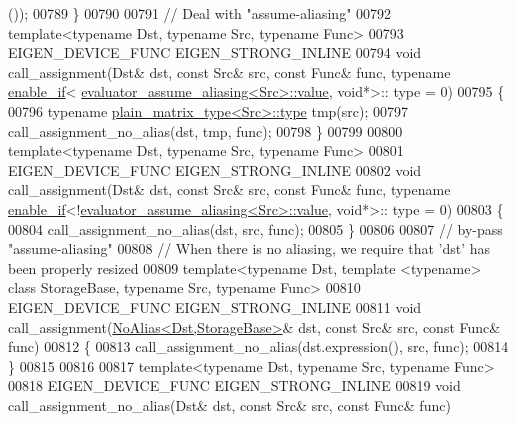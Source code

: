 \begin{DoxyCode}
      ());
00789 \}
00790                      
00791 \textcolor{comment}{// Deal with "assume-aliasing"}
00792 \textcolor{keyword}{template}<\textcolor{keyword}{typename} Dst, \textcolor{keyword}{typename} Src, \textcolor{keyword}{typename} Func>
00793 EIGEN\_DEVICE\_FUNC EIGEN\_STRONG\_INLINE
00794 \textcolor{keywordtype}{void} call\_assignment(Dst& dst, \textcolor{keyword}{const} Src& src, \textcolor{keyword}{const} Func& func, \textcolor{keyword}{typename} 
      \hyperlink{struct_eigen_1_1internal_1_1enable__if}{enable\_if}< \hyperlink{struct_eigen_1_1internal_1_1evaluator__assume__aliasing}{evaluator\_assume\_aliasing<Src>::value}, \textcolor{keywordtype}{void}*>::
      type = 0)
00795 \{
00796   \textcolor{keyword}{typename} \hyperlink{struct_eigen_1_1internal_1_1plain__matrix__type}{plain\_matrix\_type<Src>::type} tmp(src);
00797   call\_assignment\_no\_alias(dst, tmp, func);
00798 \}
00799 
00800 \textcolor{keyword}{template}<\textcolor{keyword}{typename} Dst, \textcolor{keyword}{typename} Src, \textcolor{keyword}{typename} Func>
00801 EIGEN\_DEVICE\_FUNC EIGEN\_STRONG\_INLINE
00802 \textcolor{keywordtype}{void} call\_assignment(Dst& dst, \textcolor{keyword}{const} Src& src, \textcolor{keyword}{const} Func& func, \textcolor{keyword}{typename} 
      \hyperlink{struct_eigen_1_1internal_1_1enable__if}{enable\_if}<!\hyperlink{struct_eigen_1_1internal_1_1evaluator__assume__aliasing}{evaluator\_assume\_aliasing<Src>::value}, \textcolor{keywordtype}{void}*>::
      type = 0)
00803 \{
00804   call\_assignment\_no\_alias(dst, src, func);
00805 \}
00806 
00807 \textcolor{comment}{// by-pass "assume-aliasing"}
00808 \textcolor{comment}{// When there is no aliasing, we require that 'dst' has been properly resized}
00809 \textcolor{keyword}{template}<\textcolor{keyword}{typename} Dst, \textcolor{keyword}{template} <\textcolor{keyword}{typename}> \textcolor{keyword}{class }StorageBase, \textcolor{keyword}{typename} Src, \textcolor{keyword}{typename} Func>
00810 EIGEN\_DEVICE\_FUNC EIGEN\_STRONG\_INLINE
00811 \textcolor{keywordtype}{void} call\_assignment(\hyperlink{group___core___module_class_eigen_1_1_no_alias}{NoAlias<Dst,StorageBase>}& dst, \textcolor{keyword}{const} Src& src, \textcolor{keyword}{const} Func& 
      func)
00812 \{
00813   call\_assignment\_no\_alias(dst.expression(), src, func);
00814 \}
00815 
00816 
00817 \textcolor{keyword}{template}<\textcolor{keyword}{typename} Dst, \textcolor{keyword}{typename} Src, \textcolor{keyword}{typename} Func>
00818 EIGEN\_DEVICE\_FUNC EIGEN\_STRONG\_INLINE
00819 \textcolor{keywordtype}{void} call\_assignment\_no\_alias(Dst& dst, \textcolor{keyword}{const} Src& src, \textcolor{keyword}{const} Func& func)

\end{DoxyCode}
